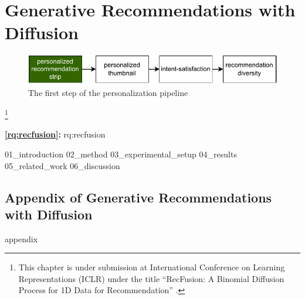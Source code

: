 
\acresetall

\chapter{Generative Recommendations with Diffusion}
\label{chapter:research-recfusion}

\begin{figure}[ht]
  \centering
  \includegraphics{images/pipeline_step1.pdf}
  \caption{The first step of the personalization pipeline}
  \label{fig:pip1}
\end{figure}

\footnote[]{This chapter is under submission at International Conference on Learning Representations (ICLR) under the title ``RecFusion: A Binomial Diffusion Process for 1D Data for Recommendation'' \cite{recfusion}.}
\acresetall


\medskip
\noindent
\textbf{\ref{rq:recfusion}:} \acl{rq:recfusion}
\medskip

\noindent

{01_introduction}
{02_method}
{03_experimental_setup}
{04_results}
{05_related_work}
{06_discussion}

\begin{appendices}
\chapter{Appendix of Generative Recommendations with Diffusion}
{appendix}
\end{appendices}

